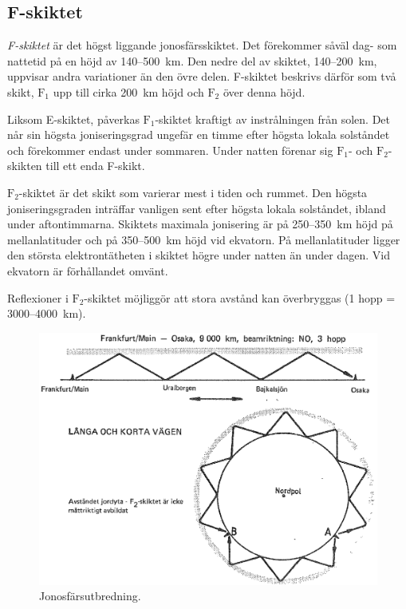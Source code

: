 \subsection{F-skiktet}

\emph{F-skiktet} är det högst liggande jonosfärsskiktet.
Det förekommer såväl dag- som nattetid på en höjd av 140--500~km.
Den nedre del av skiktet, 140--200~km, uppvisar andra variationer än den övre
delen.
F-skiktet beskrivs därför som två skikt, \(\mathrm{F_1}\) upp till cirka 200~km
höjd och \(\mathrm{F_2}\) över denna höjd.

Liksom E-skiktet, påverkas \(\mathrm{F_1}\)-skiktet kraftigt av
instrålningen från solen.
Det når sin högsta joniseringsgrad ungefär en timme efter högsta lokala
solståndet och förekommer endast under sommaren.
Under natten förenar sig \(\mathrm{F_1}\)- och \(\mathrm{F_2}\)-skikten till
ett enda F-skikt.

\(\mathrm{F_2}\)-skiktet är det skikt som varierar mest i tiden och rummet.
Den högsta joniseringsgraden inträffar vanligen sent efter högsta lokala
solståndet, ibland under aftontimmarna.
Skiktets maximala jonisering är på 250--350~km höjd på mellanlatituder och på
350--500~km höjd vid ekvatorn.
På mellanlatituder ligger den största elektrontätheten i skiktet högre under
natten än under dagen.
Vid ekvatorn är förhållandet omvänt.

Reflexioner i \(\mathrm{F_2}\)-skiktet möjliggör att stora
avstånd kan överbryggas (1 hopp = 3000--4000~km).

\begin{figure}
  \includegraphics[width=\textwidth]{images/cropped_pdfs/bild_2_7-08.pdf}
  \caption{Jonosfärsutbredning.}
  \label{fig:bildII7-8}
\end{figure}

